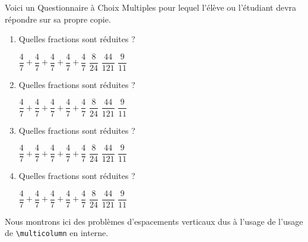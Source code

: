 \documentclass[a4,12pt]{article}
\begin{document}
\exam[kind = test]


\exercise{}

Voici un Questionnaire à Choix Multiples pour lequel l'élève
ou l'étudiant devra répondre sur sa propre copie.

\begin{enumerate}
	\item Quelles fractions sont réduites ?
	\begin{choices}
		\choice $\dfrac{4}{7}+\dfrac{4}{7}+\dfrac{4}{7}+\dfrac{4}{7}+\dfrac{4}{7}$
		\choice $\dfrac{8}{24}$
		\choice $\dfrac{44}{121}$
		\choice $\dfrac{9}{11}$
	\end{choices}

	\item Quelles fractions sont réduites ?

	\begin{choices}[4]
		\choice $\dfrac{4}{7}+\dfrac{4}{7}+\dfrac{4}{7}+\dfrac{4}{7}+\dfrac{4}{7}$
		\choice $\dfrac{8}{24}$
		\choice $\dfrac{44}{121}$
		\choice $\dfrac{9}{11}$
	\end{choices}

	\item Quelles fractions sont réduites ?
	\begin{inlineChoices}
		\choice $\dfrac{4}{7}+\dfrac{4}{7}+\dfrac{4}{7}+\dfrac{4}{7}+\dfrac{4}{7}$
		\choice $\dfrac{8}{24}$
		\choice $\dfrac{44}{121}$
		\choice $\dfrac{9}{11}$
	\end{inlineChoices}

	\item Quelles fractions sont réduites ?

	\begin{inlineChoices}
		\choice $\dfrac{4}{7}+\dfrac{4}{7}+\dfrac{4}{7}+\dfrac{4}{7}+\dfrac{4}{7}$
		\choice $\dfrac{8}{24}$
		\choice $\dfrac{44}{121}$
		\choice $\dfrac{9}{11}$
	\end{inlineChoices}
\end{enumerate}


\exercise{}

Nous montrons ici des problèmes d'espacements verticaux dus
à l'usage de l'usage de \verb+\multicolumn+ en interne.
\end{document}
